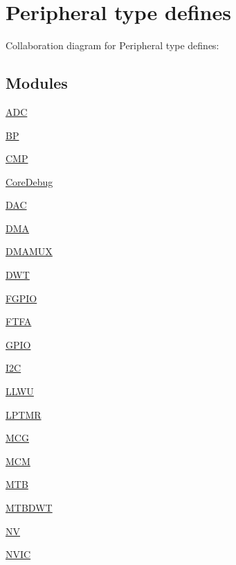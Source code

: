 \hypertarget{group___peripheral__defines}{}\section{Peripheral type defines}
\label{group___peripheral__defines}
Collaboration diagram for Peripheral type defines\+:
\subsection*{Modules}
\begin{DoxyCompactItemize}
\item 
\hyperlink{group___a_d_c___peripheral}{A\+DC}
\item 
\hyperlink{group___b_p___peripheral}{BP}
\item 
\hyperlink{group___c_m_p___peripheral}{C\+MP}
\item 
\hyperlink{group___core_debug___peripheral}{Core\+Debug}
\item 
\hyperlink{group___d_a_c___peripheral}{D\+AC}
\item 
\hyperlink{group___d_m_a___peripheral}{D\+MA}
\item 
\hyperlink{group___d_m_a_m_u_x___peripheral}{D\+M\+A\+M\+UX}
\item 
\hyperlink{group___d_w_t___peripheral}{D\+WT}
\item 
\hyperlink{group___f_g_p_i_o___peripheral}{F\+G\+P\+IO}
\item 
\hyperlink{group___f_t_f_a___peripheral}{F\+T\+FA}
\item 
\hyperlink{group___g_p_i_o___peripheral}{G\+P\+IO}
\item 
\hyperlink{group___i2_c___peripheral}{I2C}
\item 
\hyperlink{group___l_l_w_u___peripheral}{L\+L\+WU}
\item 
\hyperlink{group___l_p_t_m_r___peripheral}{L\+P\+T\+MR}
\item 
\hyperlink{group___m_c_g___peripheral}{M\+CG}
\item 
\hyperlink{group___m_c_m___peripheral}{M\+CM}
\item 
\hyperlink{group___m_t_b___peripheral}{M\+TB}
\item 
\hyperlink{group___m_t_b_d_w_t___peripheral}{M\+T\+B\+D\+WT}
\item 
\hyperlink{group___n_v___peripheral}{NV}
\item 
\hyperlink{group___n_v_i_c___peripheral}{N\+V\+IC}
\item 

\end{DoxyCompactItemize}
